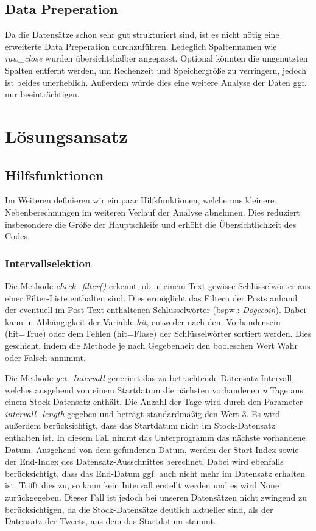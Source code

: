 \documentclass{article}
\begin{document}
\subsection{Data Preperation} \label{Data Preperation}
Da die Datensätze schon sehr gut strukturiert sind, ist es nicht nötig eine erweiterte Data Preperation durchzuführen.
Ledeglich Spaltennamen wie \textit{raw\_close} wurden übersichtshalber angepasst.
Optional könnten die ungenutzten Spalten entfernt werden, um Rechenzeit und Speichergröße zu verringern, jedoch ist beides unerheblich.
Außerdem würde dies eine weitere Analyse der Daten ggf. nur beeinträchtigen.



\section{Lösungsansatz} \label{Lösungsansatz} 


\subsection{Hilfsfunktionen} \label{Hilfsfunktionen}
Im Weiteren definieren wir ein paar Hilfsfunktionen, welche uns kleinere Nebenberechnungen im weiteren Verlauf der Analyse abnehmen.
Dies reduziert insbesondere die Größe der Hauptschleife und erhöht die Übersichtlichkeit des Codes.

\subsubsection{Intervallselektion} \label{Intervallselektion}
Die Methode \textit{check\_filter()} erkennt, ob in einem Text gewisse Schlüsselwörter aus einer Filter-Liste enthalten sind.
Dies ermöglicht das Filtern der Posts anhand der eventuell im Post-Text enthaltenen Schlüsselwörter (bspw.: \textit{Dogecoin}).
Dabei kann in Abhängigkeit der Variable \textit{hit}, entweder nach dem Vorhandensein (hit=True) oder dem Fehlen (hit=Flase) der Schlüsselwörter sortiert werden.
Dies geschieht, indem die Methode je nach Gegebenheit den booleschen Wert Wahr oder Falsch annimmt.
\par
Die Methode \textit{get\_Intervall} generiert das zu betrachtende Datensatz-Intervall, welches ausgehend von einem Startdatum die nächsten vorhandenen \textit{n} Tage aus einem Stock-Datensatz enthält.
Die Anzahl der Tage wird durch den Parameter \textit{intervall\_length} gegeben und beträgt standardmäßig den Wert 3.
Es wird außerdem berücksichtigt, dass das Startdatum nicht im Stock-Datensatz enthalten ist.
In diesem Fall nimmt das Unterprogramm das nächste vorhandene Datum.
Ausgehend von dem gefundenen Datum, werden der Start-Index sowie der End-Index des Datensatz-Ausschnittes berechnet.
Dabei wird ebenfalls berücksichtigt, dass das End-Datum ggf. auch nicht mehr im Datensatz erhalten ist.
Trifft dies zu, so kann kein Intervall erstellt werden und es wird None zurückgegeben.
Dieser Fall ist jedoch bei unseren Datensätzen nicht zwingend zu berücksichtigen, da die Stock-Datensätze deutlich aktueller sind, als der Datensatz der Tweets, aus dem das Startdatum stammt.
\end{document}
